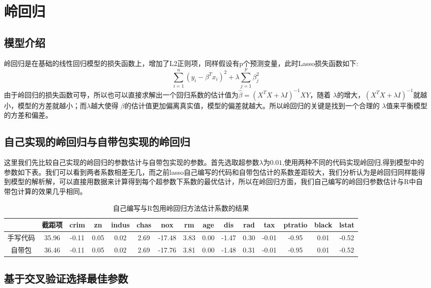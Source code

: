 \section{岭回归}
\subsection{模型介绍}
岭回归是在基础的线性回归模型的损失函数上，增加了L2正则项，同样假设有p个预测变量，此时Lasso损失函数如下:
\begin{equation}
 \sum_{i=1}^n(y_i-\beta^Tx_i)^2+\lambda\sum_{j=1}^p\beta_j^2
\end{equation}
由于岭回归的损失函数可导，所以也可以直接求解出一个回归系数的估计值为$\hat{\beta}=(X^TX+\lambda I)^{-1}XY$，随着 $\lambda$的增大，$(X^TX+\lambda I)^{-1}$就越小，模型的方差就越小；而$\lambda$越大使得 $\beta$的估计值更加偏离真实值，模型的偏差就越大。所以岭回归的关键是找到一个合理的 $\lambda$值来平衡模型的方差和偏差。

\subsection{自己实现的岭回归与自带包实现的岭回归}
这里我们先比较自己实现的岭回归的参数估计与自带包实现的参数。首先选取超参数$\lambda$为$0.01$,使用两种不同的代码实现岭回归,得到模型中的参数如下表。我们可以看到两者系数相差无几，而之前lasso自己编写的代码和自带包估计的系数差距较大，我们分析认为是岭回归同样能得到模型的解析解，可以直接用数据来计算得到每个超参数下系数的最优估计，所以在岭回归方面，我们自己编写的岭回归参数估计与R中自带包计算的效果几乎相同。

\begin{table}[htbp]
\centering
\caption{自己编写与R包用岭回归方法估计系数的结果}
\begin{tabular}{ccccccccccccccc}
  \hline
 & 截距项 & crim & zn & indus & chas & nox & rm & age & dis & rad & tax & ptratio & black & lstat \\ 
  \hline
  手写代码 & 35.96 & -0.11 & 0.05 & 0.02 & 2.69 & -17.48 & 3.83 & 0.00 & -1.47 & 0.30 & -0.01 & -0.95 & 0.01 & -0.52 \\ 
  自带包& 36.46 & -0.11 &  0.05 &  0.02  & 2.69 &-17.76 &3.81  & 0.00&  -1.48&   0.31 & -0.01&  -0.95&0.01&-0.52\\
   \hline
\end{tabular}
\end{table}

\subsection{基于交叉验证选择最佳参数}


